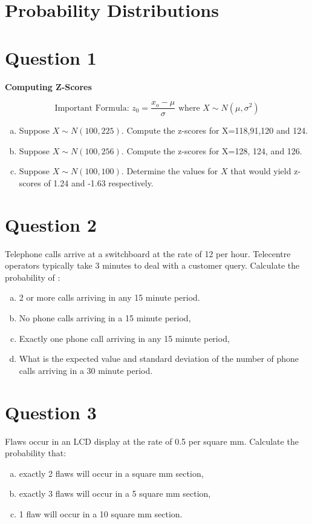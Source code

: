 \documentclass[]{article}
\begin{document}
\section*{Probability Distributions}

\section*{Question 1}
\noindent \textbf{Computing Z-Scores} 


\[\mbox{Important Formula: } z_0 =  \frac{x_o - \mu }{ \sigma}  \mbox{ where } X \sim N(\mu,\sigma^2) \]
\begin{enumerate}[(a)]
\item Suppose $X \sim N(100,225)$. Compute the z-scores for X=118,91,120 and 124.
\item Suppose $X \sim N(100,256)$. Compute the z-scores for X=128, 124, and 126.
\item Suppose $X \sim N(100,100)$. Determine the values for $X$ that would yield z-scores of 1.24 and -1.63 respectively.
\end{enumerate}


\section*{Question 2}
Telephone calls arrive at a switchboard at the rate of 12 per hour.  Telecentre operators typically take 3 minutes to deal with a customer query.
Calculate the probability of :

\begin{enumerate}[(a)]
\item 2 or more calls arriving in any 15 minute period.
\item No phone calls arriving in a 15 minute period,
\item Exactly one phone call arriving in any 15 minute period,
\item What is the expected value and standard deviation of the number
of phone calls arriving in a 30 minute period.
\end{enumerate}


\section*{Question 3}
Flaws occur in an LCD display at the rate of 0.5 per square mm. Calculate the probability
that:
\begin{enumerate}[(a)]
    \item exactly 2 flaws will occur in a square mm section,
\item exactly 3 flaws will occur in a 5 square mm section,
\item 1 flaw will occur in a 10 square mm section.
\end{enumerate}
\end{document}
